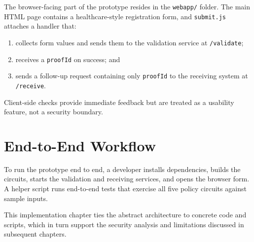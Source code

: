 The browser-facing part of the prototype resides in the \texttt{webapp/}
folder. The main HTML page contains a healthcare-style registration form, and
\texttt{submit.js} attaches a handler that:

\begin{enumerate}[leftmargin=*]
  \item collects form values and sends them to the validation service at
        \texttt{/validate};
  \item receives a \texttt{proofId} on success; and
  \item sends a follow-up request containing only \texttt{proofId} to the
        receiving system at \texttt{/receive}.
\end{enumerate}

Client-side checks provide immediate feedback but are treated as a usability
feature, not a security boundary.

\section{End-to-End Workflow}

To run the prototype end to end, a developer installs dependencies, builds the
circuits, starts the validation and receiving services, and opens the browser
form. A helper script runs end-to-end tests that exercise all five policy
circuits against sample inputs.

This implementation chapter ties the abstract architecture to concrete code and
scripts, which in turn support the security analysis and limitations discussed
in subsequent chapters.
